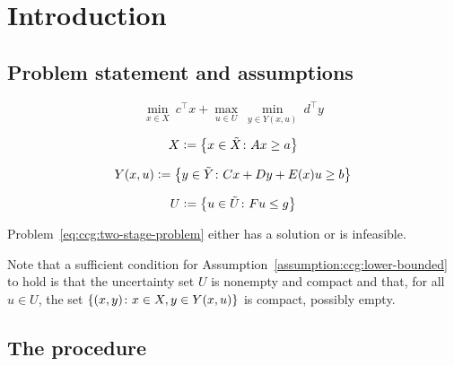 \section{Introduction}

\subsection{Problem statement and assumptions}

\begin{equation}
    \label{eq:ccg:two-stage-problem}
    \min_{x\in X} \ c^\top x + \max_{ u\in U } \ \min_{y\in Y(x,u)} \ d^\top y
\end{equation}

\begin{equation*}
    X \mathrel{{\mathop:}{=}} \left\{ x\in \tilde{X} \colon Ax \ge a \right\}
\end{equation*}

\begin{equation*}
    Y(x,u) \mathrel{{\mathop:}{=}} \left\{ y\in \tilde{Y} \colon Cx + Dy + E(x)u \ge b \right\}
\end{equation*}

\begin{equation*}
    U \mathrel{{\mathop:}{=}} \left\{ u\in\tilde{U} \colon Fu \le g \right\}
\end{equation*}

\begin{assumption}
    \label{assumption:ccg:lower-bounded}
    Problem~\eqref{eq:ccg:two-stage-problem} either has a solution or is
    infeasible. 
\end{assumption}

Note that a sufficient condition for
Assumption~\ref{assumption:ccg:lower-bounded} to hold is that the uncertainty
set $U$ is nonempty and compact and that, for all $u\in U$, the set $\left\{
(x,y) \colon x\in X, y\in Y(x,u) \right\}$ is compact, possibly empty.

\subsection{The procedure}

